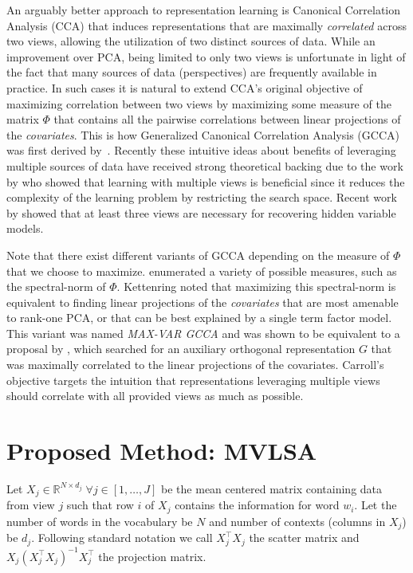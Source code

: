 \documentclass[11pt]{article}
\begin{document}
An arguably better approach to representation learning is Canonical
Correlation Analysis (CCA) that induces representations that are
maximally \emph{correlated} across two views, allowing the utilization
of two distinct sources of data. While an improvement over PCA, being
limited to only two views is unfortunate in light of the fact that
many sources of data (perspectives) are frequently available in
practice.  In such cases it is natural to extend CCA's original
objective of maximizing correlation between two views by maximizing
some measure of the matrix $\Phi$ that contains all the pairwise
correlations between linear projections of the \emph{covariates}. This
is how Generalized Canonical Correlation Analysis (GCCA) was first
derived by~. Recently these intuitive
ideas about benefits of leveraging multiple sources of data have
received strong theoretical backing due to the work by
 who showed that learning with
multiple views is beneficial since it reduces the complexity of the
learning problem by restricting the search space.  Recent work by
 showed that at least three views are
necessary for recovering hidden variable models.

Note that there exist different variants of GCCA depending on the
measure of $\Phi$ that we choose to
maximize.  enumerated a variety of
possible measures, such as the spectral-norm of $\Phi$. Kettenring
noted that maximizing this spectral-norm is equivalent to finding
linear projections of the \emph{covariates} that are most amenable to
rank-one PCA, or that can be best explained by a single term factor
model. This variant was named \emph{MAX-VAR GCCA} and was shown to be
equivalent to a proposal by , which
searched for an auxiliary orthogonal representation $G$ that was
maximally correlated to the linear projections of the
covariates.  Carroll's objective targets the intuition
that representations leveraging multiple views should correlate with
all provided views as much as possible.

\section{Proposed Method: MVLSA}
\label{sec:gcca}
Let $X_j \in \mathbb{R}^{N\times d_j} \;
\forall j \in [1,\ldots,J]$ be the mean centered matrix containing
data from view $j$ such that row $i$ of $X_j$ contains the information for
word $w_i$. Let the number of words in the vocabulary be $N$
and number of contexts (columns in $X_j$) be $d_j$. %
Following standard
notation \cite{hastie2009elements} we call $X_j^\top X_j$ the scatter
matrix and $X_j (X_j^\top X_j)^{-1}X_j^\top$ the projection matrix.
\end{document}
